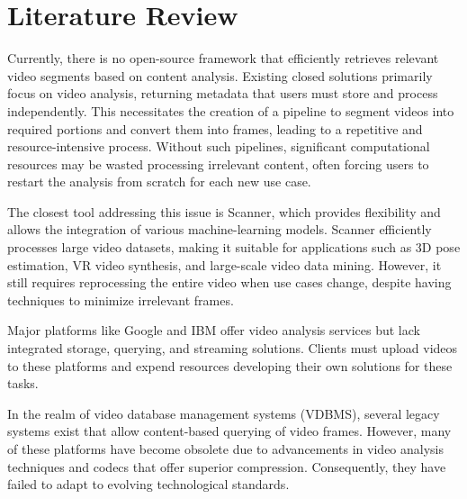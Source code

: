 \documentclass[conference]{IEEEtran}
\begin{document}
\section{Literature Review}
Currently, there is no open-source framework that efficiently retrieves relevant video segments based on content analysis. Existing closed solutions primarily focus on video analysis, returning metadata that users must store and process independently. This necessitates the creation of a pipeline to segment videos into required portions and convert them into frames, leading to a repetitive and resource-intensive process. Without such pipelines, significant computational resources may be wasted processing irrelevant content, often forcing users to restart the analysis from scratch for each new use case.\\
\par 
The closest tool addressing this issue is Scanner\cite{poms2018scanner}, which provides flexibility and allows the integration of various machine-learning models. Scanner\cite{poms2018scanner} efficiently processes large video datasets, making it suitable for applications such as 3D pose estimation, VR video synthesis, and large-scale video data mining. However, it still requires reprocessing the entire video when use cases change, despite having techniques to minimize irrelevant frames.\\
\par 
Major platforms like Google and IBM offer video analysis services but lack integrated storage, querying, and streaming solutions. Clients must upload videos to these platforms and expend resources developing their own solutions for these tasks.\\
\par 
In the realm of video database management systems (VDBMS), several legacy systems exist that allow content-based querying of video frames. However, many of these platforms have become obsolete due to advancements in video analysis techniques and codecs that offer superior compression. Consequently, they have failed to adapt to evolving technological standards.
\\\par
\end{document}
